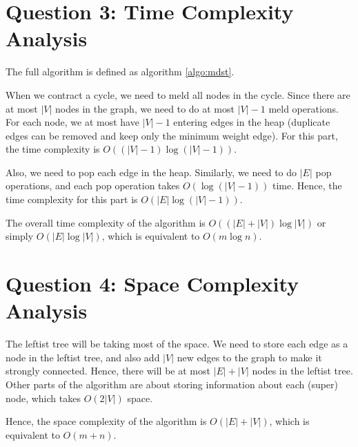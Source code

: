 \documentclass[a4paper,12pt]{article}
\begin{document}
\section*{Question 3: Time Complexity Analysis}

The full algorithm is defined as algorithm \ref{algo:mdst}.

\begin{center}
\end{center}

When we contract a cycle, we need to meld all nodes in the cycle.
Since there are at most $|V|$ nodes in the graph, we need to do at most $|V|-1$ meld operations.
For each node, we at most have $|V| - 1$ entering edges in the heap (duplicate edges can be removed and keep only the minimum weight edge).
For this part, the time complexity is $O((|V| - 1) \log (|V| - 1))$.

Also, we need to pop each edge in the heap.
Similarly, we need to do $|E|$ pop operations, and each pop operation takes $O(\log (|V| - 1))$ time.
Hence, the time complexity for this part is $O(|E| \log (|V| - 1))$.

The overall time complexity of the algorithm is $O((|E| + |V|) \log |V|)$ or simply $O(|E| \log |V|)$, which is equivalent to $O(m \log n)$.

\section*{Question 4: Space Complexity Analysis}

The leftist tree will be taking most of the space.
We need to store each edge as a node in the leftist tree, and also add $|V|$ new edges to the graph to make it strongly connected.
Hence, there will be at most $|E| + |V|$ nodes in the leftist tree.
Other parts of the algorithm are about storing information about each (super) node, which takes $O(2|V|)$ space.

Hence, the space complexity of the algorithm is $O(|E| + |V|)$, which is equivalent to $O(m + n)$.
\end{document}
